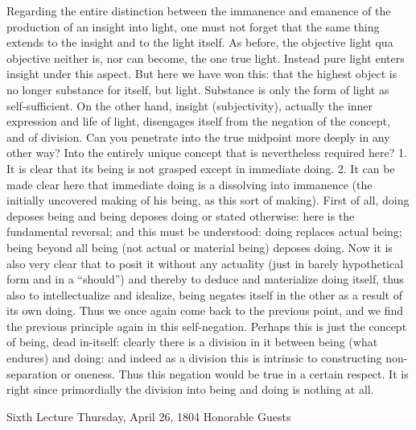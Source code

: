 Regarding the entire distinction
between the immanence and emanence
of the production of an insight into light,
one must not forget that the same thing
extends to the insight and to the light itself.
As before, the objective light qua objective
neither is, nor can become, the one true light.
Instead pure light enters insight under this aspect.
But here we have won this:
that the highest object is no longer
substance for itself, but light.
Substance is only the form of light as self-sufficient.
On the other hand, insight (subjectivity),
actually the inner expression and life of light,
disengages itself from the negation of
the concept, and of division.
Can you penetrate into the true midpoint
more deeply in any other way?
Into the entirely unique concept
that is nevertheless required here?
1. It is clear that its being is not grasped
except in immediate doing.
2. It can be made clear here that immediate doing is
a dissolving into immanence
(the initially uncovered making of his being,
as this sort of making).
First of all, doing deposes being
and being deposes doing
or stated otherwise:
here is the fundamental reversal;
and this must be understood:
doing replaces actual being;
being beyond all being
(not actual or material being)
deposes doing.
Now it is also very clear that
to posit it without any actuality
(just in barely hypothetical form and in a “should”)
and thereby to deduce and materialize doing itself,
thus also to intellectualize and idealize,
being negates itself in the other
as a result of its own doing.
Thus we once again come back to the previous point,
and we find the previous principle again in this self-negation.
Perhaps this is just the concept of being, dead in-itself:
clearly there is a division in it
between being (what endures) and doing:
and indeed as a division this is intrinsic
to constructing non-separation or oneness.
Thus this negation would be true in a certain respect.
It is right since primordially the division
into being and doing is nothing at all.

Sixth Lecture
Thursday, April 26, 1804
Honorable Guests

